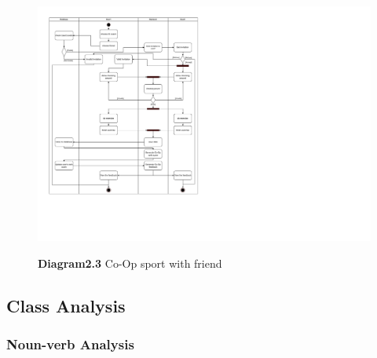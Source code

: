 \documentclass[a4paper]{article}
\begin{document}
	\begin{figure}[H]
		\centering
		\caption*{\textbf{Diagram2.3} Co-Op sport with friend}
		\includegraphics[width=\textwidth]{images/ActivityDiagram_CoOp.pdf}
		\label{AD_CoOp}
	\end{figure}
	\newpage

	\subsection{Class Analysis}

	\subsubsection{Noun-verb Analysis}
\end{document}
